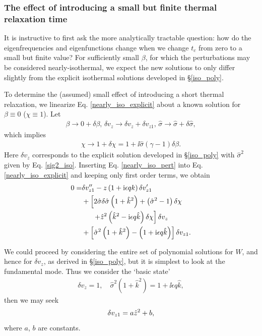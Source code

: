 \subsubsection{The effect of introducing a small but finite
  thermal relaxation time} 
It is instructive to first ask  the more analytically tractable
question: how 
do the eigenfrequencies and eigenfunctions change when we change
$t_c$ from zero to a small but finite value? For sufficiently small
$\beta$, for which the perturbations may be considered 
nearly-isothermal, we expect the new solutions to only differ slightly
from the explicit isothermal solutions developed in \S\ref{iso_poly}. 


To determine the (assumed) small effect of introducing a short thermal
relaxation, we linearize Eq. \ref{nearly_iso_explicit} about a known 
solution for $\beta\equiv0$  ($\chi\equiv 1$). 
Let 
\begin{align}\label{nearly_iso_pert}
  \beta \to 0 + \delta\beta,\, \delta v_z\to \delta v_z+\delta
  v_{z1},\,\hat{\sigma} \to \hat{\sigma} + \delta\hat{\sigma}, 
\end{align}
which implies 
\begin{align}
  \chi \to 1 + \delta\chi = 1 + \ii \hat{\sigma}\left(\gamma-1\right)\delta\beta.
\end{align}
Here $\delta v_z$ corresponds to the explicit solution developed in
\S\ref{iso_poly} with  $\hat{\sigma}^2$ given by Eq. \ref{sig2_iso}. Inserting
Eq. \ref{nearly_iso_pert} into Eq. \ref{nearly_iso_explicit}  and keeping
only first order terms, we obtain 
\begin{align}
 0 =& \delta v_{z1}^{\prime\prime} - z\left(1 + \mathrm{i}\epsilon q
   k\right)\delta v_{z1}^\prime\notag\\
 &+ \left[2\hat{\sigma}\delta\hat{\sigma}\left(1 + \hat{k}^2\right) +
   \left(\hat{\sigma}^2 - 1\right)\delta\chi \right.\notag\\
&\phantom{++} \left. + \hat{z}^2\left(\hat{k}^2 -
     \mathrm{i}\epsilon q \hat{k}\right)\delta\chi\right]\delta v_z\notag\\
 &+\left[\hat{\sigma}^2\left(1 + \hat{k}^2\right) - \left(1+\mathrm{i}\epsilon
     q \hat{k}\right)\right]\delta v_{z1}.\label{nearly_iso4}
\end{align}

We could proceed by considering the entire set of polynomial solutions
for $W$, and hence for $\delta v_z$, as derived in \S\ref{iso_poly}, but it
is simplest to look at the fundamental mode. Thus we consider the `basic state' 
 \begin{align*}
   \delta v_z = 1,\quad \hat{\sigma}^2\left(1+\hat{k}^2\right) = 1 +
   \ii\epsilon q \hat{k},
 \end{align*}
 then we may seek 
 \begin{align}
   \delta v_{z1} = a \hat{z}^2 + b,
 \end{align}
where $a$, $b$ are constants. 

